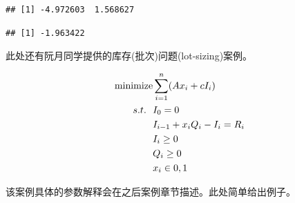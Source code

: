\documentclass[]{ctexbook}
\newenvironment{Shaded}{\begin{snugshade}}{\end{snugshade}}
\newcommand{\OperatorTok}[1]{\textcolor[rgb]{0.81,0.36,0.00}{\textbf{#1}}}
\newcommand{\NormalTok}[1]{#1}
\begin{document}
\begin{Shaded}
\end{Shaded}

\begin{verbatim}
## [1] -4.972603  1.568627
\end{verbatim}

\begin{verbatim}
## [1] -1.963422
\end{verbatim}

此处还有阮月同学提供的库存(批次)问题(lot-sizing)案例。

\begin{align}
\text{minimize} &\sum_{i=1}^n(Ax_i+cI_i) \notag\\
s.t. ~~ &I_0 = 0 \notag \\
&I_{i-1}+x_iQ_i-I_i=R_i \notag \\
&I_i\geq 0 \notag \\
&Q_i\geq 0 \notag \\
&x_i \in{0,1}\notag \\
\label{eq:lotsize}
\end{align}

该案例具体的参数解释会在之后案例章节描述。此处简单给出例子。
\end{document}
